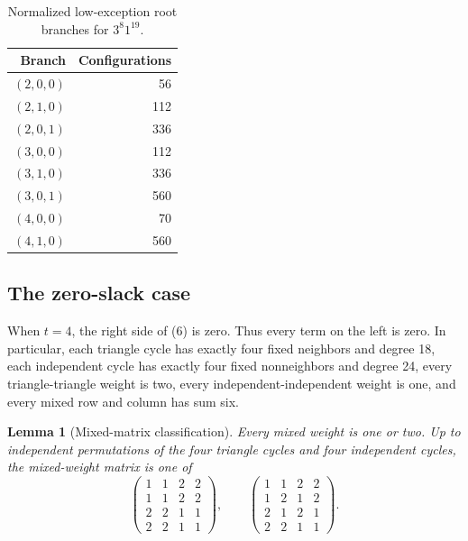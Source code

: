 \documentclass[11pt]{article}
\newtheorem{lemma}[theorem]{Lemma}
\begin{document}
\begin{table}[h]
\centering
\begin{tabular}{rr}
\toprule
Branch & Configurations\\
\midrule
$(2,0,0)$ & 56\\
$(2,1,0)$ & 112\\
$(2,0,1)$ & 336\\
$(3,0,0)$ & 112\\
$(3,1,0)$ & 336\\
$(3,0,1)$ & 560\\
$(4,0,0)$ & 70\\
$(4,1,0)$ & 560\\
\bottomrule
\end{tabular}
\caption{Normalized low-exception root branches for $3^8 1^{19}$.}
\label{tab:c8-cover}
\end{table}

\subsection{The zero-slack case}

When $t=4$, the right side of (6) is zero. Thus every term on the left is
zero. In particular, each triangle cycle has exactly four fixed neighbors
and degree 18, each independent cycle has exactly four fixed nonneighbors
and degree 24, every triangle-triangle weight is two, every
independent-independent weight is one, and every mixed row and column has
sum six.

\begin{lemma}[Mixed-matrix classification]
\label{lem:c8-matrix}
Every mixed weight is one or two. Up to independent permutations of the four
triangle cycles and four independent cycles, the mixed-weight matrix is one
of
\[
\begin{pmatrix}
1&1&2&2\\
1&1&2&2\\
2&2&1&1\\
2&2&1&1
\end{pmatrix},
\qquad
\begin{pmatrix}
1&1&2&2\\
1&2&1&2\\
2&1&2&1\\
2&2&1&1
\end{pmatrix}. \tag{8}
\]
\end{lemma}
\end{document}
